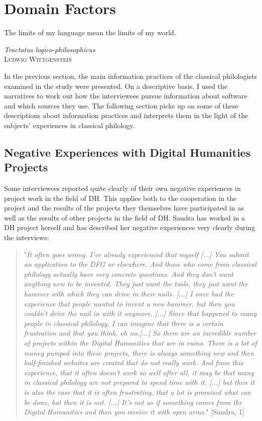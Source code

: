 \documentclass[12pt, a4paper, titlepage, oneside, abstract=true, toc=listof, toc=bibliography]{scrreprt}
\begin{document}
{\section{Domain Factors}
\label{sec:Domain_Factors}
\epigraph{The limits of my language mean the limits of my world.}{\textit{Tractatus logico-philosophicus}\\\textsc{Ludwig Wittgenstein}}

In the previous section, the main information practices of the classical philologists examined in the study were presented. On a descriptive basis, I used the narratives to work out how the interviewees pursue information about software and which sources they use. The following section picks up on some of these descriptions about information practices and interprets them in the light of the subjects' experiences in classical philology. 

\subsection{Negative Experiences with Digital Humanities Projects}
\label{sec:Neg_DH}
Some interviewees reported quite clearly of their own negative experiences in project work in the field of DH. This applies both to the cooperation in the project and the results of the projects they themselves have participated in as well as the results of other projects in the field of DH. Sandra has worked in a DH project herself and has described her negative experiences very clearly during the interviews: 

\begin{quotation}
"\textit{It often goes wrong. I've already experienced that myself [...] You submit an application to the DFG or elsewhere. And those who come from classical philology actually have very concrete questions. And they don't want anything new to be invented. They just want the tools, they just want the hammer with which they can drive in their nails. [...] I once had the experience that people wanted to invent a new hammer, but then you couldn't drive the nail in with it anymore. [...] Since that happened to many people in classical philology, I can imagine that there is a certain frustration and that you think, oh no.[...] So there are an incredible number of projects within the Digital Humanities that are in ruins. There is a lot of money pumped into these projects, there is always something new and then half-finished websites are created that do not really work. And from this experience, that it often doesn't work so well after all, it may be that many in classical philology are not prepared to spend time with it. [...] but then it is also the case that it is often frustrating, that a lot is promised what can be done, but then it is not. [...] It's not as if something comes from the Digital Humanities and then you receive it with open arms.}" [Sandra, 1]
\end{quotation}

}
\end{document}
